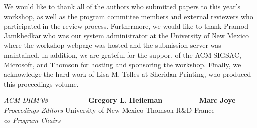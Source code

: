 \documentclass[11pt]{article}
\begin{document}
We would like to thank all of the authors who submitted papers to this year's workshop, as well as the program committee members and external reviewers who participated in the review process.  Furthermore, we would like to thank Pramod Jamkhedkar who was our system administrator at the University of New Mexico where the workshop webpage was hosted and the submission server was maintained.  In addition, we are grateful for the support of the ACM SIGSAC, Microsoft, and Thomson for hosting and sponsoring the workshop.  Finally, we acknowledge the hard work of Lisa M. Tolles at Sheridan Printing, who produced this proceedings volume. 
\begin{tabbing}

{\it ACM-DRM'08}  \ \ \ \ \ \ \ \ \ \ \ \= {\bf Gregory L. Heileman} \ \ \ \ \ \ \ \ \ \ \= {\bf Marc Joye} \\
{\it Proceedings Editors} \> University of New Mexico \>  Thomson R\&D France \\
{\it co-Program Chairs}
\end{tabbing}
\end{document}

